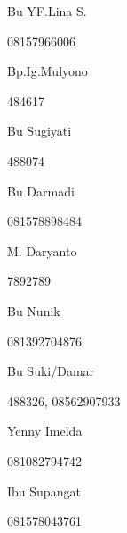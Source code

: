 \documentclass{article}
\begin{document}
\begin{figure}
\centering
\begin{minipage}{3.27cm}
Bu YF.Lina S.

08157966006

\end{minipage}
\end{figure}
\begin{figure}
\centering
\begin{minipage}{3.17cm}
Bp.Ig.Mulyono

484617

\end{minipage}
\end{figure}
\begin{figure}
\centering
\begin{minipage}{3.17cm}
Bu Sugiyati

488074

\end{minipage}
\end{figure}
\begin{figure}
\centering
\begin{minipage}{2.969cm}
Bu Darmadi

081578898484

\end{minipage}
\end{figure}
\begin{figure}
\centering
\begin{minipage}{2.969cm}
M. Daryanto

7892789

\end{minipage}
\end{figure}
\begin{figure}
\centering
\begin{minipage}{3.069cm}
Bu Nunik

081392704876
\end{minipage}
\end{figure}
\begin{figure}
\centering
\begin{minipage}{3.17cm}
Bu Suki/Damar

488326, 08562907933

\end{minipage}
\end{figure}
\begin{figure}
\centering
\begin{minipage}{3.27cm}
Yenny Imelda

081082794742

Ibu Supangat

081578043761

\end{minipage}
\end{figure}
\end{document}
